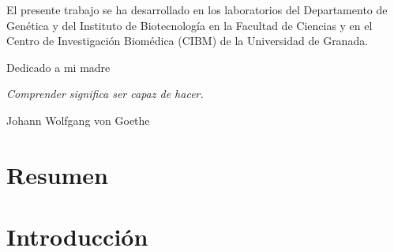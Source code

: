 \documentclass[a4paper,twoside,12pt]{book}
\begin{document}
{\rule{0pt}{85ex} El presente trabajo se ha desarrollado en los laboratorios del Departamento de Gen\'etica y del Instituto de Biotecnolog\'ia en la Facultad de Ciencias y en el Centro de Investigaci\'on Biom\'edica (CIBM) de la Universidad de Granada.
 
 
\newpage
\cleardoublepage

\newpage
\cleardoublepage
\null{}
{
\begin{flushright}
 Dedicado a mi madre

\end{flushright}
}
\newpage
\cleardoublepage




\null{}
{
\hfill \begin{minipage}{8cm}
\textsl{Comprender significa ser capaz de hacer.}

\begin{flushright}
Johann Wolfgang von Goethe  
\end{flushright}

\end{minipage}
}
\newpage
\cleardoublepage






\dominitoc
\dominilof
\dominilot
\tableofcontents
\listoffigures
\listoftables
\clearpage
%

%
%
\pagestyle{fancy}


\mainmatter



\pagestyle{fancy}
\lhead{\nouppercase{\bfseries{\leftmark}}}
\rhead{\nouppercase{\bfseries{\rightmark}}}
\fancyhead[LO]{\bfseries{}}
\fancyhead[RE]{\bfseries{}}
\cfoot{\thepage}
\renewcommand{\headrulewidth}{0.5pt}




\chapter{Resumen}


\chapter{Introducción}

%




}
\end{document}
